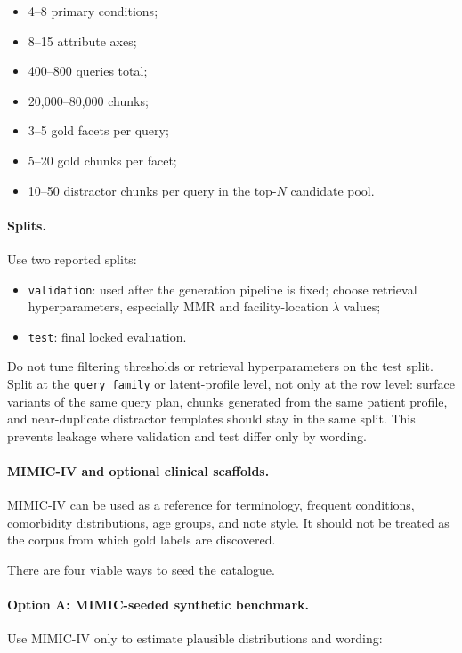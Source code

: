 \documentclass[11pt,a4paper]{article}
\newcommand{\field}[1]{\texttt{#1}}
\begin{document}
\begin{itemize}[leftmargin=*]
	\item 4--8 primary conditions;
	\item 8--15 attribute axes;
	\item 400--800 queries total;
	\item 20,000--80,000 chunks;
	\item 3--5 gold facets per query;
	\item 5--20 gold chunks per facet;
	\item 10--50 distractor chunks per query in the top-$N$ candidate pool.
\end{itemize}

\paragraph{Splits.}
Use two reported splits:

\begin{itemize}[leftmargin=*]
	\item \field{validation}: used after the generation pipeline is fixed; choose retrieval hyperparameters, especially MMR and facility-location $\lambda$ values;
	\item \field{test}: final locked evaluation.
\end{itemize}

Do not tune filtering thresholds or retrieval hyperparameters on the test split. Split at the \field{query\_family} or latent-profile level, not only at the row level: surface variants of the same query plan, chunks generated from the same patient profile, and near-duplicate distractor templates should stay in the same split. This prevents leakage where validation and test differ only by wording.

\paragraph{MIMIC-IV and optional clinical scaffolds.}

MIMIC-IV can be used as a reference for terminology, frequent conditions, comorbidity distributions, age groups, and note style. It should not be treated as the corpus from which gold labels are discovered.

There are four viable ways to seed the catalogue.

\paragraph{Option A: MIMIC-seeded synthetic benchmark.}
Use MIMIC-IV only to estimate plausible distributions and wording:
\end{document}
